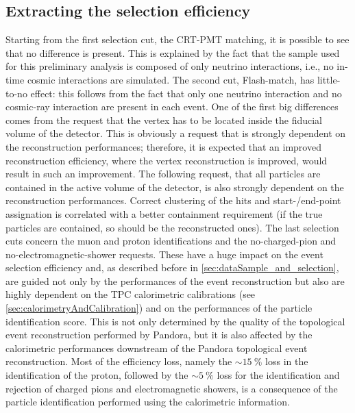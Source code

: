 \subsection{Extracting the selection efficiency} \label{sec:efficiencyPidExtraction}

Starting from the first selection cut, the CRT-PMT matching, it is possible to see that no difference is present. 
This is explained by the fact that the sample used for this preliminary analysis is composed of only neutrino interactions, i.e., no in-time cosmic interactions are simulated. 
The second cut, Flash-match, has little-to-no effect: this follows from the fact that only one neutrino interaction and no cosmic-ray interaction are present in each event. 
One of the first big differences comes from the request that the vertex has to be located inside the fiducial volume of the detector. 
This is obviously a request that is strongly dependent on the reconstruction performances; therefore, it is expected that an improved reconstruction efficiency, where the vertex reconstruction is improved, would result in such an improvement. 
The following request, that all particles are contained in the active volume of the detector, is also strongly dependent on the reconstruction performances. Correct clustering of the hits and start-/end-point assignation is correlated with a better containment requirement (if the true particles are contained, so should be the reconstructed ones). 
The last selection cuts concern the muon and proton identifications and the no-charged-pion and no-electromagnetic-shower requests. These have a huge impact on the event selection efficiency and, as described before in \autoref{sec:dataSample_and_selection}, are guided not only by the performances of the event reconstruction but also are highly dependent on the TPC calorimetric calibrations (see \autoref{sec:calorimetryAndCalibration}) and on the performances of the particle identification score. This is not only determined by the quality of the topological event reconstruction performed by Pandora, but it is also affected by the calorimetric performances downstream of the Pandora topological event reconstruction. Most of the efficiency loss, namely the ${\sim}\SI{15}{\percent}$ loss in the identification of the proton, followed by the ${\sim}\SI{5}{\percent}$ loss for the identification and rejection of charged pions and electromagnetic showers, is a consequence of the particle identification performed using the calorimetric information.
